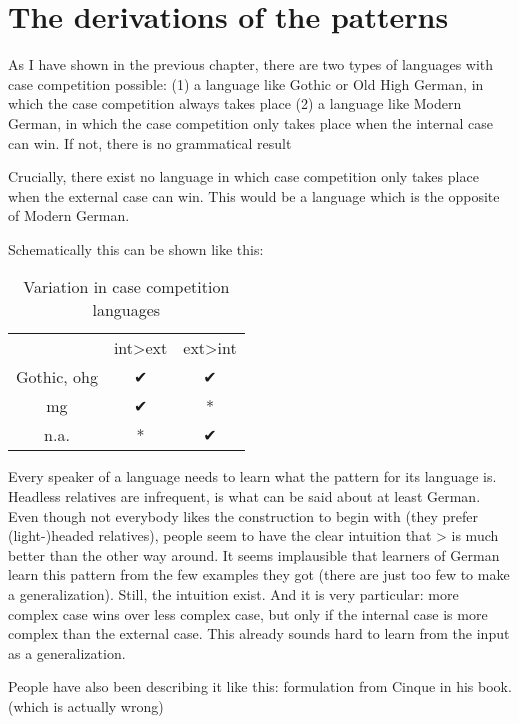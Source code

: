 
\chapter{The derivations of the patterns}\label{ch:relativization}

As I have shown in the previous chapter, there are two types of languages with case competition possible:
(1) a language like Gothic or Old High German, in which the case competition always takes place
(2) a language like Modern German, in which the case competition only takes place when the internal case can win. If not, there is no grammatical result

Crucially, there exist no language in which case competition only takes place when the external case can win. This would be a language which is the opposite of Modern German.

Schematically this can be shown like this:

\begin{table}[H]
 \center
 \caption {Variation in case competition languages}
  \begin{tabular}{ccc}
  \toprule
        & \ac{int}>\ac{ext}  & \ac{ext}>\ac{int} \\
        \cmidrule{2-3}
  Gothic, \ac{ohg} & ✔          & ✔         \\
  \ac{mg}  & ✔           & *         \\
  n.a.     & *          & ✔         \\
  \bottomrule
  \end{tabular}
\end{table}

Every speaker of a language needs to learn what the pattern for its language is. Headless relatives are infrequent, is what can be said about at least German. Even though not everybody likes the construction to begin with (they prefer (light-)headed relatives), people seem to have the clear intuition that > is much better than the other way around. It seems implausible that learners of German learn this pattern from the few examples they got (there are just too few to make a generalization). Still, the intuition exist. And it is very particular: more complex case wins over less complex case, but only if the internal case is more complex than the external case. This already sounds hard to learn from the input as a generalization.

People have also been describing it like this: formulation from Cinque in his book. (which is actually wrong)

